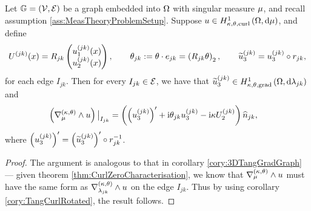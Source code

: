 \begin{theorem} \label{thm:TangCurlGraph}
	Let $\mathbb{G}=\left( \mathcal{V}, \mathcal{E} \right)$ be a graph embedded into $\Omega$ with singular measure $\mu$, and recall assumption \ref{ass:MeasTheoryProblemSetup}.
	Suppose $u\in H^1_{\kappa,\theta,\mathrm{curl}}\left( \Omega, \mathrm{d}\mu \right)$, and define
	\begin{align*}
		U^{(jk)}(x) = R_{jk}\begin{pmatrix} u_1^{(jk)}(x) \\ u_2^{(jk)}(x) \end{pmatrix},
		\qquad \theta_{jk} := \theta\cdot e_{jk} = \left(  R_{jk}\theta  \right)_2,
		\qquad \widetilde{u}_3^{(jk)} = u_3^{(jk)} \circ r_{jk},
	\end{align*}
	for each edge $I_{jk}$.
	Then for every $I_{jk}\in\mathcal{E}$, we have that $\widetilde{u}_3^{(jk)}\in H^1_{\kappa,\theta,\mathrm{grad}}\left( \Omega, \mathrm{d}\lambda_{jk} \right)$ and
	\begin{align*}
		\left(  \nabla_{\mu}^{\left( \kappa, \theta \right)}\wedge u  \right)\big\vert_{I_{jk}} &= 
		\left(  \left( u_3^{(jk)} \right)' + \mathrm{i}\theta_{jk} u_3^{(jk)} - \mathrm{i}\kappa U_2^{(jk)}  \right)\widehat{n}_{jk},
	\end{align*}
	where $\left( u_3^{(jk)} \right)' = \left( \widetilde{u}_3^{(jk)} \right)' \circ r_{jk}^{-1}$.
\end{theorem}
\begin{proof}
	The argument is analogous to that in corollary \ref{cory:3DTangGradGraph} --- given theorem \ref{thm:CurlZeroCharacterisation}, we know that $\nabla_{\mu}^{\left( \kappa, \theta \right)}\wedge u$ must have the same form as $\nabla_{\lambda_{jk}}^{\left( \kappa, \theta \right)}\wedge u$ on the edge $I_{jk}$.
	Thus by using corollary \ref{cory:TangCurlRotated}, the result follows.
\end{proof}

